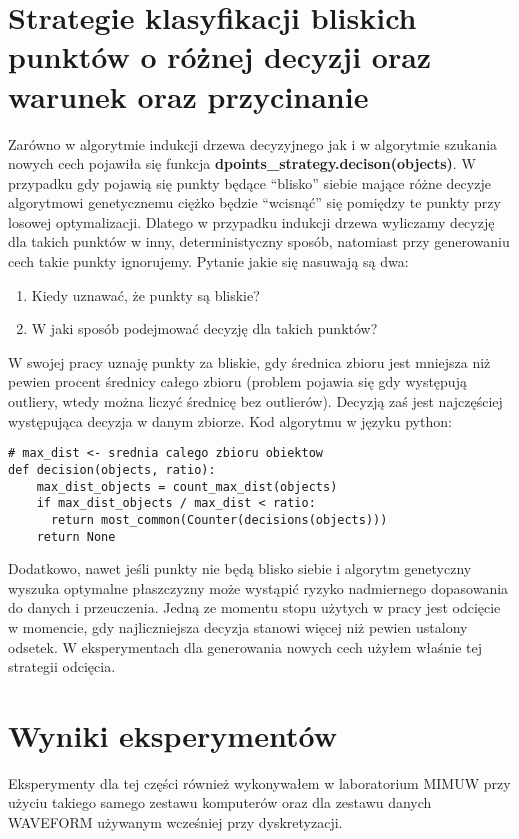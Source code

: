 \documentclass[magisterska]{pracamgr}
\theoremstyle{plain}
\theoremstyle{definition}
\theoremstyle{remark}
\begin{document}
\section{Strategie klasyfikacji bliskich punktów o różnej decyzji oraz warunek oraz przycinanie}
Zarówno w algorytmie indukcji drzewa decyzyjnego jak i w algorytmie szukania 
nowych cech pojawiła się funkcja \textbf{dpoints\_strategy.decison(objects)}. W przypadku
gdy pojawią się punkty będące ``blisko'' siebie mające różne decyzje algorytmowi genetycznemu ciężko
będzie ``wcisnąć'' się pomiędzy te punkty przy losowej optymalizacji. Dlatego w przypadku indukcji drzewa 
wyliczamy decyzję dla takich punktów w inny, deterministyczny sposób, natomiast przy generowaniu cech
takie punkty ignorujemy. Pytanie jakie się nasuwają są dwa:
\begin{enumerate}
 \item Kiedy uznawać, że punkty są bliskie?
 \item W jaki sposób podejmować decyzję dla takich punktów?
\end{enumerate}
W swojej pracy uznaję punkty za bliskie, gdy średnica zbioru jest mniejsza niż pewien procent 
średnicy całego zbioru (problem pojawia się gdy występują outliery, wtedy można liczyć średnicę
bez outlierów). Decyzją zaś jest najczęściej występująca decyzja w danym zbiorze. Kod algorytmu w języku python:
\begin{lstlisting}
# max_dist <- srednia calego zbioru obiektow
def decision(objects, ratio):
	max_dist_objects = count_max_dist(objects)
	if max_dist_objects / max_dist < ratio:
	  return most_common(Counter(decisions(objects)))
	return None
\end{lstlisting}
Dodatkowo, nawet jeśli punkty nie będą blisko siebie i algorytm genetyczny wyszuka optymalne płaszczyzny może
wystąpić ryzyko nadmiernego dopasowania do danych i przeuczenia. Jedną ze momentu stopu użytych w pracy 
jest odcięcie w momencie, gdy najliczniejsza decyzja stanowi więcej niż pewien ustalony odsetek. 
W eksperymentach dla generowania nowych cech użyłem właśnie tej strategii odcięcia.

\section{Wyniki eksperymentów}
Eksperymenty dla tej części również wykonywałem w laboratorium MIMUW przy użyciu takiego samego zestawu komputerów
oraz dla zestawu danych WAVEFORM używanym wcześniej przy dyskretyzacji.
\end{document}
